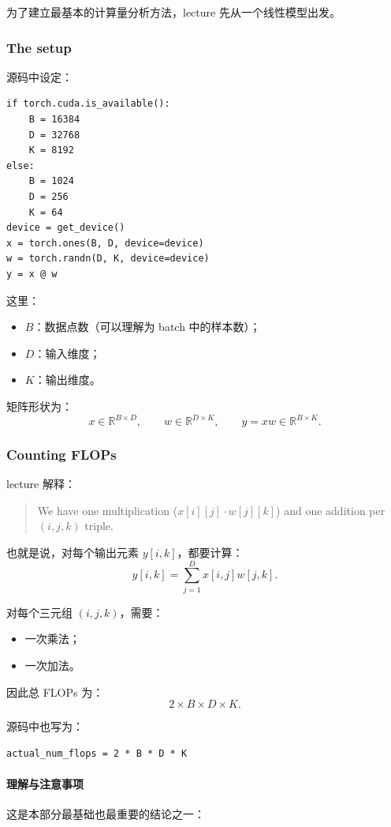 \documentclass[a4paper,UTF8]{article}
\numberwithin{equation}{section}
\begin{document}
为了建立最基本的计算量分析方法，lecture 先从一个线性模型出发。

\subsubsection{The setup}

源码中设定：
\begin{verbatim}
if torch.cuda.is_available():
    B = 16384
    D = 32768
    K = 8192
else:
    B = 1024
    D = 256
    K = 64
device = get_device()
x = torch.ones(B, D, device=device)
w = torch.randn(D, K, device=device)
y = x @ w
\end{verbatim}

这里：
\begin{itemize}
    \item \(B\)：数据点数（可以理解为 batch 中的样本数）；
    \item \(D\)：输入维度；
    \item \(K\)：输出维度。
\end{itemize}

矩阵形状为：
\[
x \in \mathbb{R}^{B \times D}, \qquad
w \in \mathbb{R}^{D \times K}, \qquad
y = xw \in \mathbb{R}^{B \times K}.
\]

\subsubsection{Counting FLOPs}

lecture 解释：
\begin{quote}
We have one multiplication (\(x[i][j] \cdot w[j][k]\)) and one addition per \((i,j,k)\) triple.
\end{quote}

也就是说，对每个输出元素 \(y[i,k]\)，都要计算：
\[
y[i,k] = \sum_{j=1}^D x[i,j] w[j,k].
\]

对每个三元组 \((i,j,k)\)，需要：
\begin{itemize}
    \item 一次乘法；
    \item 一次加法。
\end{itemize}

因此总 FLOPs 为：
\[
2 \times B \times D \times K.
\]

源码中也写为：
\begin{verbatim}
actual_num_flops = 2 * B * D * K
\end{verbatim}

\paragraph{理解与注意事项}
这是本部分最基础也最重要的结论之一：
\end{document}
